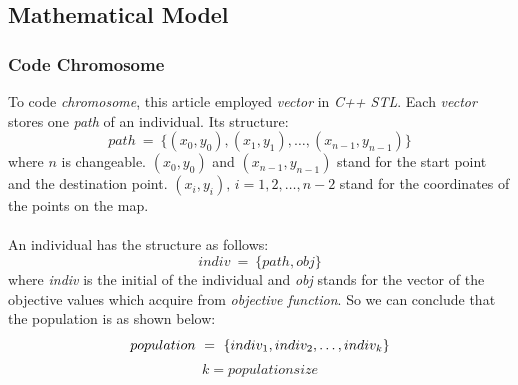 \documentclass[a4paper, 11pt]{article}
\begin{document}
\subsection{Mathematical Model}
\subsubsection{Code Chromosome}
To code \emph{chromosome}, this article employed \emph{vector} in \emph{C++ STL}. Each \emph{vector} stores one \emph{path} of an individual. Its structure:
$$
path\ =\ \{(x_0,y_0),(x_1,y_1),\ldots,(x_{n-1},y_{n-1})\}
$$
where $n$ is changeable. $(x_0,y_0)$ and $(x_{n-1},y_{n-1})$ stand for the start point and the destination point.
$(x_i,y_i),\, i=1,2,\ldots,n-2$ stand for the coordinates of the points on the map.\\
\\
An individual has the structure as follows:
$$
indiv\ =\ \{path,obj\}
$$
where \emph{indiv} is the initial of the individual and \emph{obj} stands for the vector of the objective values which acquire from \emph{objective function}. So we can conclude that the population is as shown below:
$$
population\ =\ \{indiv_1,indiv_2,\ldots,indiv_k\}\\
$$
$$
k=population size
$$
\end{document}
